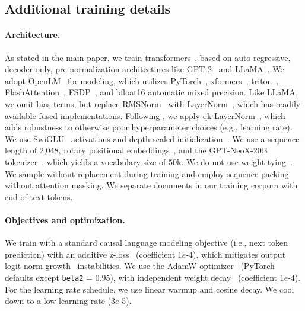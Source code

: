 \begin{appendix}
\section{Additional training details}
\label{appx:additional_training_main}

\paragraph{Architecture.}
As stated in the main paper, we train transformers~\cite{transformer}, based on auto-regressive, decoder-only, pre-normalization architectures like GPT-2~\cite{Radford2019LanguageMA} and LLaMA~\cite{llama}.
We adopt OpenLM~\cite{open_lm} for modeling, which utilizes PyTorch~\cite{paszke2019pytorch,pytorch2}, xformers~\cite{xFormers2022}, triton~\cite{triton}, FlashAttention~\cite{dao2022flashattention}, FSDP~\cite{Zhao2023PyTorchFE}, and bfloat16 automatic mixed precision.
Like LLaMA, we omit bias terms, but replace RMSNorm~\cite{Zhang2019RootMS} with LayerNorm~\cite{ba2016layer}, which has readily available fused implementations.
Following \citet{wortsman2023small}, we apply qk-LayerNorm~\cite{dehghani2023scaling}, which adds robustness to otherwise poor hyperparameter choices (e.g., learning rate).
We use SwiGLU~\cite{swiglu} activations and depth-scaled initialization~\cite{zhang-etal-2019-improving}.
We use a sequence length of 2,048, rotary positional embeddings~\cite{rope}, and the GPT-NeoX-20B tokenizer~\cite{neox}, which yields a vocabulary size of 50k.
We do not use weight tying~\cite{press-wolf-2017-using,Inan2016TyingWV}.
We sample without replacement during training and employ sequence packing without attention masking.
We separate documents in our training corpora with end-of-text tokens.

\paragraph{Objectives and optimization.}
We train with a standard causal language modeling objective (i.e., next token prediction) with an additive z-loss~\cite{Chowdhery2022PaLMSL} (coefficient 1$e$-4), which mitigates output logit norm growth~\cite{merrill-etal-2021-effects} instabilities.
We use the AdamW optimizer~\cite{loshchilov2017decoupled} (PyTorch defaults except \texttt{beta2} = 0.95), with independent weight decay~\cite{wortsman2023small} (coefficient 1$e$-4).
For the learning rate schedule, we use linear warmup and cosine decay.
We cool down to a low learning rate (3$e$-5).


\end{appendix}
